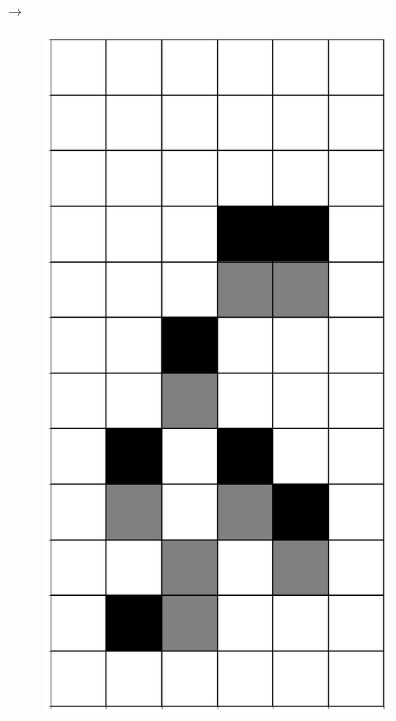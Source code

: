 \documentclass[12pt]{article}
\numberwithin{figure}{section} %
\begin{document}
\begin{figure}[H]
\begin{subfigure}{0.3\textwidth}
     \subcaption{}
   \end{subfigure}
      {\LARGE$\xrightarrow{}$}
      \newline
   \setcounter{subfigure}{0}
      \begin{subfigure}{0.3\textwidth}
     \centering
     \includegraphics[angle=270,width=\linewidth]{Section4/5.0}

\end{subfigure}
\end{figure}
\end{document}
